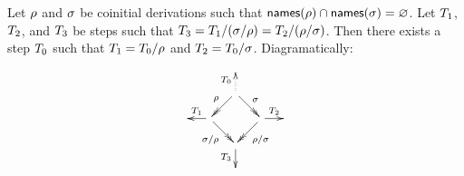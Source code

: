 \begin{lemma}
Let $\rho$ and $\sigma$ be coinitial derivations such that
$\mathsf{names}(\rho) \cap \mathsf{names}(\sigma) = \varnothing$.
Let $T_1$, $T_2$, and $T_3$
be steps such that
$T_3 = T_1/(\sigma/\rho) = T_2/(\rho/\sigma)$.
Then there exists a step $T_0$ such that
$T_1 = T_0/\rho$ and $T_2 = T_0/\sigma$.
Diagramatically:
\[
  \xymatrix@R=.5cm@C=.5cm{
    &&&
  \\
    &
    & \ar@{.>}[u]^{\redexthree_0} \ar@{->>}[ld]_{\redseq} \ar@{->>}[rd]^{\redseqtwo} &
  \\
    &
    \ar[l]_{\redexthree_1}
    \ar@{->>}[rd]_{\redseqtwo/\redseq} & & \ar@{->>}[ld]^{\redseq/\redseqtwo} \ar[r]^{\redexthree_2}
    &
  \\
    &
    &
    \ar[d]_{\redexthree_3}
    &
  \\
    &&&
  }
\]
\end{lemma}
